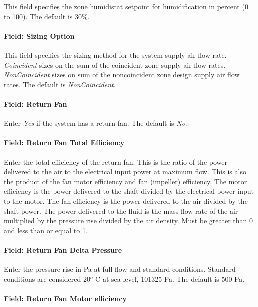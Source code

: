 This field specifies the zone humidistat setpoint for humidification in percent (0 to 100). The default is 30\%.

\paragraph{Field: Sizing Option}\label{field-sizing-option-1}

This field specifies the sizing method for the system supply air flow rate. \emph{Coincident} sizes on the sum of the coincident zone supply air flow rates. \emph{NonCoincident} sizes on sum of the noncoincident zone design supply air flow rates. The default is \emph{NonCoincident}.

\paragraph{Field: Return Fan}\label{field-return-fan-1}

Enter \emph{Yes} if the system has a return fan. The default is \emph{No}.

\paragraph{Field: Return Fan Total Efficiency}\label{field-return-fan-total-efficiency-1}

Enter the total efficiency of the return fan. This is the ratio of the power delivered to the air to the electrical input power at maximum flow. This is also the product of the fan motor efficiency and fan (impeller) efficiency. The motor efficiency is the power delivered to the shaft divided by the electrical power input to the motor. The fan efficiency is the power delivered to the air divided by the shaft power. The power delivered to the fluid is the mass flow rate of the air multiplied by the pressure rise divided by the air density. Must be greater than 0 and less than or equal to 1.

\paragraph{Field: Return Fan Delta Pressure}\label{field-return-fan-delta-pressure-3}

Enter the pressure rise in Pa at full flow and standard conditions. Standard conditions are considered 20\(^{o}\) C at sea level, 101325 Pa. The default is 500 Pa.

\paragraph{Field: Return Fan Motor efficiency}\label{field-return-fan-motor-efficiency-3}

